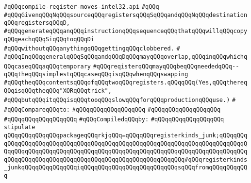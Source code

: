 \label{src/lib/compiler/back/low/intel32/code/compile-register-moves-intel32.api}
\verb|#qQQqcompile-register-moves-intel32.api|\newline
\verb|#qQQq|\newline
\verb|#qQQqGivenqQQqNqQQqsourceqQQqregistersqQQqSqQQqandqQQqNqQQqdestinationqQQqregistersqQQqD,|\newline
\verb|#qQQqgenerateqQQqanqQQqinstructionqQQqsequenceqQQqthatqQQqwillqQQqcopyqQQqeachqQQqSiqQQqtoqQQqDi|\newline
\verb|#qQQqwithoutqQQqanythingqQQqgettingqQQqclobbered.|\newline
\verb|#|\newline
\verb|#qQQqInqQQqgeneralqQQqSqQQqandqQQqDqQQqmayqQQqoverlap,qQQqinqQQqwhichqQQqcaseqQQqaqQQqtemporary|\newline
\verb|#qQQqreqisterqQQqmayqQQqbeqQQqneededqQQq--qQQqtheqQQqsimplestqQQqcaseqQQqisqQQqwhenqQQqswapping|\newline
\verb|#qQQqtheqQQqcontentsqQQqofqQQqtwoqQQqregisters.qQQqqQQq(Yes,qQQqthereqQQqisqQQqtheqQQq"XORqQQqtrick",|\newline
\verb|#qQQqbutqQQqitqQQqisqQQqtooqQQqslowqQQqforqQQqproductionqQQquse.)|\newline
\verb|#|\newline
\verb|#qQQqCompareqQQqto:|\newline
\verb|#qQQqqQQqqQQqqQQqqQQq|\newline
\verb|#qQQqqQQqqQQqqQQqqQQq|\newline
\verb|#qQQqqQQqqQQqqQQqqQQq|\newline
\newline
\verb|#qQQqCompiledqQQqby:|\newline
\verb|#qQQqqQQqqQQqqQQqqQQq|\newline
\newline
\verb|stipulate|\newline
\verb|qQQqqQQqqQQqqQQqpackageqQQqrkjqQQq=qQQqqQQqregisterkinds_junk;qQQqqQQqqQQqqQQqqQQqqQQqqQQqqQQqqQQqqQQqqQQqqQQqqQQqqQQqqQQqqQQqqQQqqQQqqQQqqQQqqQQqqQQqqQQqqQQqqQQqqQQqqQQqqQQqqQQqqQQqqQQqqQQqqQQqqQQqqQQqqQQqqQQqqQQqqQQqqQQqqQQqqQQqqQQqqQQqqQQqqQQqqQQqqQQqqQQqqQQq#qQQqregisterkinds_junkqQQqqQQqqQQqqQQqiqQQqqQQqqQQqqQQqqQQqqQQqqQQqsqQQqfromqQQqqQQqqQQq|\newline
